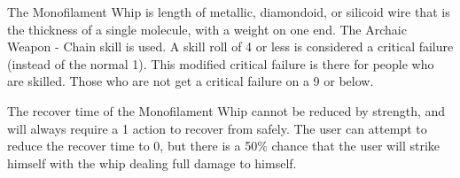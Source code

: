 The Monofilament Whip is length of metallic, diamondoid, or silicoid wire that is the thickness of a single molecule, with a weight on one end.	The Archaic Weapon - Chain skill is used.  A skill roll of 4 or less is considered a critical failure (instead of the normal 1). This modified critical failure is there for people who are skilled.  Those who are not get a critical failure on a 9 or below.

The recover time of the Monofilament Whip cannot be reduced by strength, and will always require a 1 action to recover from safely. The user can attempt to reduce the recover time to 0, but there is a 50\% chance that the user will strike himself with the	whip dealing full damage to himself.			